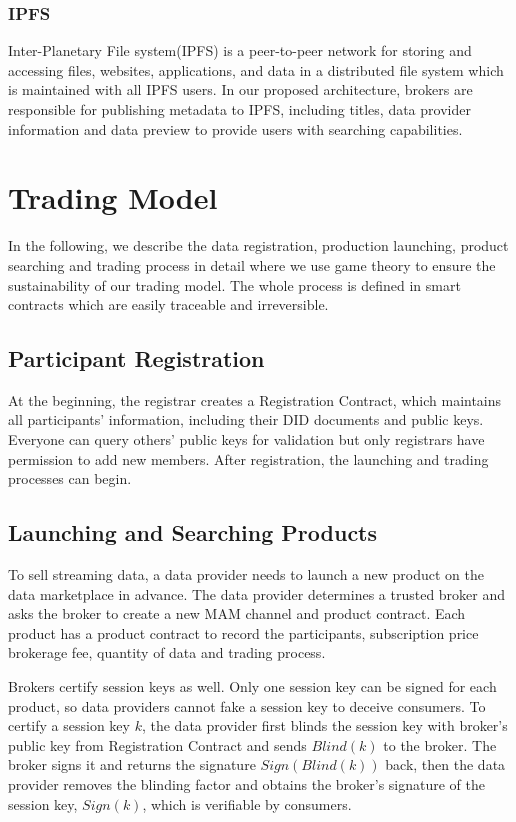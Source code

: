 \documentclass[journal,10pt,a4paper]{IEEEtran}
\begin{document}
\subsubsection{IPFS}
Inter-Planetary File system(IPFS)\cite{IPFS} is a peer-to-peer network for storing and accessing files, websites, applications, and data in a distributed file system which is maintained with all IPFS users. In our proposed architecture, brokers are responsible for publishing metadata to IPFS, including titles, data provider information and data preview to provide users with searching capabilities.

\section{\normalsize\textbf{Trading Model}}
In the following, we describe the data registration, production launching, product searching and trading process in detail where we use game theory to ensure the sustainability of our trading model. The whole process is defined in smart contracts which are easily traceable and irreversible.

\subsection{Participant Registration}
At the beginning, the registrar creates a Registration Contract, which maintains all participants' information, including their DID documents and public keys. Everyone can query others' public keys for validation but only registrars have permission to add new members. After registration, the launching and trading processes can begin.

\subsection{Launching and Searching Products}
To sell streaming data, a data provider needs to launch a new product on the data marketplace in advance. The data provider determines a trusted broker and asks the broker to create a new MAM channel and product contract. Each product has a product contract to record the participants, subscription price brokerage fee, quantity of data and trading process.

Brokers certify session keys as well. Only one session key can be signed for each product, so data providers cannot fake a session key to deceive consumers. To certify a session key $k$, the data provider first blinds the session key with broker's public key from Registration Contract and sends $Blind(k)$ to the broker. The broker signs it and returns the signature $Sign(Blind(k))$ back, then the data provider removes the blinding factor and obtains the broker's signature of the session key, $Sign(k)$, which is verifiable by consumers.
\end{document}
